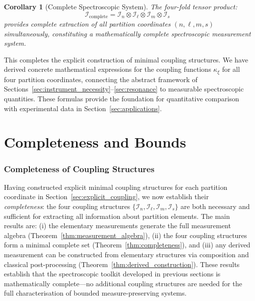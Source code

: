 \documentclass[twocolumn,10pt,a4paper]{article}
\newtheorem{corollary}[theorem]{Corollary}
\theoremstyle{remark}
\begin{document}
\begin{corollary}[Complete Spectroscopic System]
\label{cor:complete_system}
The four-fold tensor product:
\begin{equation}
\mathcal{I}_{\text{complete}} = \mathcal{I}_n \otimes \mathcal{I}_\ell \otimes \mathcal{I}_m \otimes \mathcal{I}_s
\end{equation}
provides complete extraction of all partition coordinates $(n, \ell, m, s)$ simultaneously, constituting a mathematically complete spectroscopic measurement system.
\end{corollary}

This completes the explicit construction of minimal coupling structures. We have derived concrete mathematical expressions for the coupling functions $\kappa_\xi$ for all four partition coordinates, connecting the abstract framework of Sections~\ref{sec:instrument_necessity}--\ref{sec:resonance} to measurable spectroscopic quantities. These formulas provide the foundation for quantitative comparison with experimental data in Section~\ref{sec:applications}.



\part{Completeness and Bounds}
\label{part:completeness}

\section{Completeness of Coupling Structures}
\label{sec:completeness}

Having constructed explicit minimal coupling structures for each partition coordinate in Section~\ref{sec:explicit_coupling}, we now establish their \emph{completeness}: the four coupling structures $\{\mathcal{I}_n, \mathcal{I}_\ell, \mathcal{I}_m, \mathcal{I}_s\}$ are both necessary and sufficient for extracting all information about partition elements. The main results are: (i) the elementary measurements generate the full measurement algebra (Theorem~\ref{thm:measurement_algebra}), (ii) the four coupling structures form a minimal complete set (Theorem~\ref{thm:completeness}), and (iii) any derived measurement can be constructed from elementary structures via composition and classical post-processing (Theorem~\ref{thm:derived_construction}). These results establish that the spectroscopic toolkit developed in previous sections is mathematically complete—no additional coupling structures are needed for the full characterisation of bounded measure-preserving systems.
\end{document}
